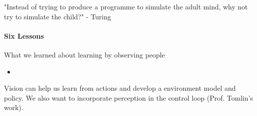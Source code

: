 \documentclass{report}
\begin{document}
"Instead of trying to produce a programme to simulate the adult mind, why not try to simulate the child?" - Turing

\paragraph{Six Lessons} What we learned about learning by observing people
\begin{itemize}
    \item 
\end{itemize}

Vision can help us learn from actions and develop a environment model and policy. We also want to incorporate perception in the control loop (Prof. Tomlin's work).
\end{document}
